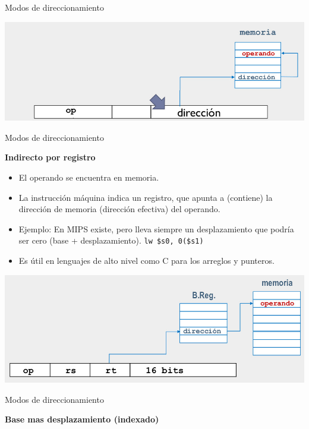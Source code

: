 \documentclass[aspectratio=169,compress]{beamer}
\begin{document}
\begin{footnotesize}
\begin{frame}{Modos de direccionamiento}
\begin{itemize}
\end{itemize}

	\begin{center}
\includegraphics[scale=0.3]{images/dir-indirecto.jpg} 
	\end{center}
\end{frame}


\begin{frame}{Modos de direccionamiento}
\begin{center}\textbf{Indirecto por registro}\end{center}

\begin{itemize}
\item El operando se encuentra en memoria.
\item La instrucción máquina indica un registro, que apunta a (contiene) la dirección de memoria (dirección efectiva) del operando.
\item Ejemplo: En MIPS existe, pero lleva siempre un desplazamiento que podría ser cero (base + desplazamiento). \texttt{lw \$s0, 0(\$s1)}
\item Es útil en lenguajes de alto nivel como C para los arreglos y punteros.

\end{itemize}

	\begin{center}
\includegraphics[scale=0.3]{images/dir-indirecto-por-registro.jpg} 
	\end{center}
\end{frame}


\begin{frame}{Modos de direccionamiento}
\begin{center}\textbf{Base mas desplazamiento (indexado)}\end{center}


\end{frame}
\end{footnotesize}
\end{document}
